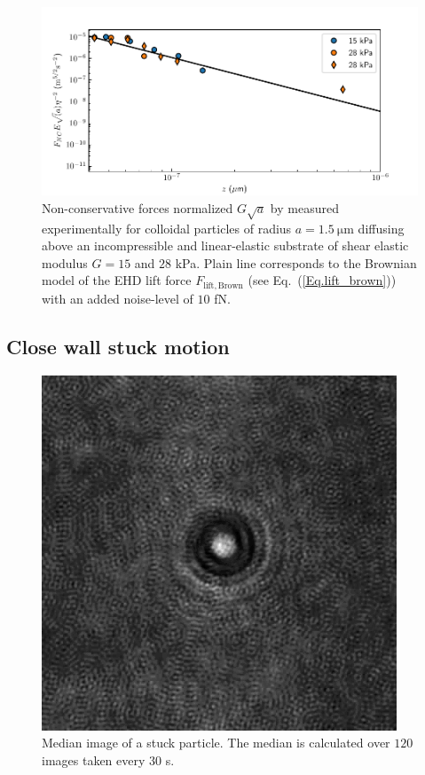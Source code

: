 \begin{figure}[H]
	\centering
	\includegraphics{02_body/chapter4/images/EHD_forces/EHD_force_rescale.pdf}
	\caption{Non-conservative forces  normalized $ G\sqrt{a} $ by measured experimentally for colloidal particles of radius $a=1.5 ~\mathrm{\mu m}$ diffusing above an incompressible and linear-elastic substrate of shear elastic modulus $G=15$ and $28$ kPa. Plain line corresponds to the Brownian model of the \gls{EHD} lift force $F_\mathrm{lift, Brown}$ (see Eq.~(\ref{Eq.lift_brown})) with an added noise-level of $10$ fN.}
	\label{fig.ncforcenormalized}
\end{figure}


\subsection{Close wall stuck motion}

\begin{figure}[H]
	\centering
	\includegraphics[scale=0.5]{02_body/chapter4/images/stucked_particle/ghost.png}
	\caption{Median image of a stuck particle. The median is calculated over $120$ images taken every $30$ s.}
	\label{fig.ghost_stucked}
\end{figure}

